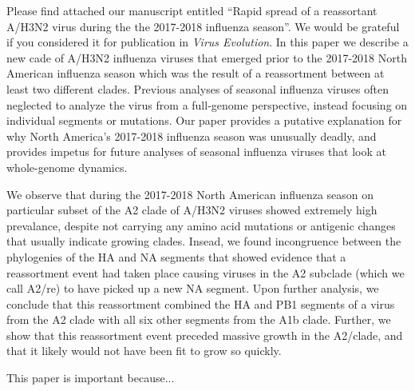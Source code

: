 \documentclass[stdletter,letterpaper,addrfromright,orderfromdateto,dateleft,11pt,noaddrto,sigleft]{newlfm}
\begin{document}
\begin{newlfm}
Please find attached our manuscript entitled ``Rapid spread of a reassortant A/H3N2 virus during the the 2017-2018 influenza season''.
We would be grateful if you considered it for publication in \textit{Virus Evolution}.
In this paper we describe a new cade of A/H3N2 influenza viruses that emerged prior to the 2017-2018 North American influenza season which was the result of a reassortment between at least two different clades.
Previous analyses of seasonal influenza viruses often neglected to analyze the virus from a full-genome perspective, instead focusing on individual segments or mutations.
Our paper provides a putative explanation for why North America's 2017-2018 influenza season was unusually deadly, and provides impetus for future analyses of seasonal influenza viruses that look at whole-genome dynamics.

We observe that during the 2017-2018 North American influenza season on particular subset of the A2 clade of A/H3N2 viruses showed extremely high prevalance, despite not carrying any amino acid mutations or antigenic changes that usually indicate growing clades.
Insead, we found incongruence between the phylogenies of the HA and NA segments that showed evidence that a reassortment event had taken place causing viruses in the A2 subclade (which we call A2/re) to have picked up a new NA segment.
Upon further analysis, we conclude that this reassortment combined the HA and PB1 segments of a virus from the A2 clade with all six other segments from the A1b clade.
Further, we show that this reassortment event preceded massive growth in the A2/clade, and that it likely would not have been fit to grow so quickly.

This paper is important because...

\end{newlfm}
\end{document}
